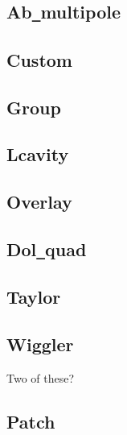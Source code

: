 \subsection{Ab{\tt\_}multipole}
\subsection{Custom}
\subsection{Group}
\subsection{Lcavity}
\subsection{Overlay}
\subsection{Dol{\tt\_}quad}
\subsection{Taylor}
\subsection{Wiggler} Two of these?
\subsection{Patch}
